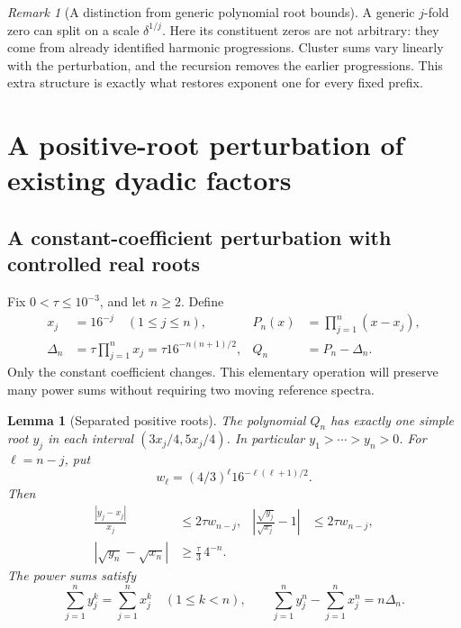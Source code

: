 \documentclass[11pt,a4paper]{article}
\numberwithin{equation}{section}
\newtheorem{lemma}[theorem]{Lemma}
\theoremstyle{definition}
\theoremstyle{remark}
\newtheorem{remark}[theorem]{Remark}
\begin{document}
\begin{remark}[A distinction from generic polynomial root bounds]
A generic $j$-fold zero can split on a scale $\delta^{1/j}$. Here its
constituent zeros are not arbitrary: they come from already identified
harmonic progressions. Cluster sums vary linearly with the perturbation,
and the recursion removes the earlier progressions. This extra structure
is exactly what restores exponent one for every fixed prefix.
\end{remark}

\section{A positive-root perturbation of existing dyadic factors}
\label{sec:construction}

\subsection{A constant-coefficient perturbation with controlled real roots}

Fix $0<\tau\le10^{-3}$, and let $n\ge2$. Define
\begin{equation}
 \begin{aligned}
 x_j&=16^{-j}\quad(1\le j\le n),&
 P_n(x)&=\prod_{j=1}^n(x-x_j),\\
 \Delta_n&=\tau\prod_{j=1}^nx_j=\tau16^{-n(n+1)/2},&
 Q_n&=P_n-\Delta_n.
 \end{aligned}
 \label{eq:root-polynomials}
\end{equation}
Only the constant coefficient changes. This elementary operation will preserve
many power sums without requiring two moving reference spectra.

\begin{lemma}[Separated positive roots]\label{lem:root-perturbation}
The polynomial $Q_n$ has exactly one simple root $y_j$ in each interval
$(3x_j/4,5x_j/4)$. In particular $y_1>\cdots>y_n>0$.
For $\ell=n-j$, put
\begin{equation}
 w_\ell=(4/3)^\ell16^{-\ell(\ell+1)/2}.
 \label{eq:w}
\end{equation}
Then
\begin{align}
 \frac{|y_j-x_j|}{x_j}&\le2\tau w_{n-j},
 &\left|\frac{\sqrt{y_j}}{\sqrt{x_j}}-1\right|
       &\le2\tau w_{n-j},                                      \label{eq:root-relative}\\
 |\sqrt{y_n}-\sqrt{x_n}|&\ge\frac\tau3\,4^{-n}. \label{eq:root-lower}
\end{align}
The power sums satisfy
\begin{equation}
 \sum_{j=1}^ny_j^k=\sum_{j=1}^nx_j^k\quad(1\le k<n),
 \qquad
 \sum_{j=1}^ny_j^n-\sum_{j=1}^nx_j^n=n\Delta_n.
 \label{eq:newton-match}
\end{equation}
\end{lemma}
\end{document}
